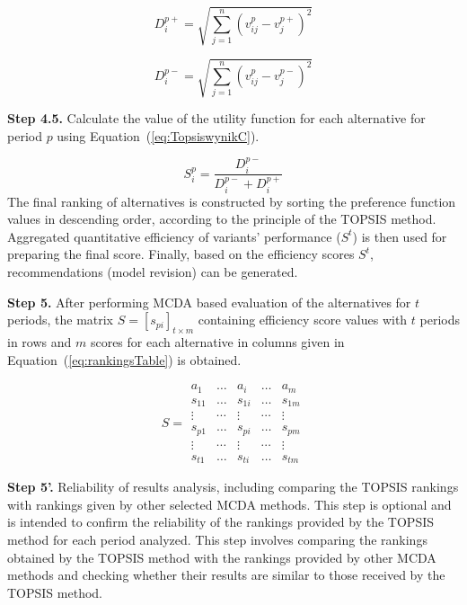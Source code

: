 \documentclass[5p,times]{elsarticle}
\begin{document}
\begin{equation}
    D_{i}^{p+} = \sqrt{\sum_{j=1}^{n}(v_{ij}^{p} - v_{j}^{p+})^{2}} \label{eq:sqrtPIS}
\end{equation}

\begin{equation}
    D_{i}^{p-} = \sqrt{\sum_{j=1}^{n}(v_{ij}^{p}-v_{j}^{p-})^{2}} \label{eq:sqrtNIS}
\end{equation}

\textbf{Step 4.5.} Calculate the value of the utility function for each alternative for period $p$ using Equation~(\ref{eq:TopsiswynikC}).

\begin{equation}
    S_{i}^{p} = \frac{D_{i}^{p-}}{D_{i}^{p-}+D_{i}^{p+}} \label{eq:TopsiswynikC}
\end{equation}
%
The final ranking of alternatives is constructed by sorting the preference function values in descending order, according to the principle of the TOPSIS method. Aggregated quantitative efficiency of variants' performance ($S^{t}$) is then used for preparing the final score. Finally, based on the efficiency scores $S^{t}$, recommendations (model revision) can be generated. 

\textbf{Step 5.}
After performing MCDA based evaluation of the alternatives for $t$ periods, the matrix $S = [s_{pi}]_{t \times m}$ containing efficiency score values with $t$ periods in rows and $m$ scores for each alternative in columns given in Equation~(\ref{eq:rankingsTable}) is obtained.

\begin{equation}
    S = \begin{array}{lllll}
    a_{1} & \ldots & a_{i} & \ldots & a_{m} \\ \hline
    s_{11} & \ldots & s_{1i} & \ldots & s_{1m} \\
    \vdots & \cdots & \vdots & \cdots & \vdots \\
    s_{p1} & \ldots & s_{pi} & \ldots & s_{pm} \\
    \vdots & \cdots & \vdots & \cdots & \vdots \\
    s_{t1} & \ldots & s_{ti} & \ldots & s_{tm} \label{eq:rankingsTable}
\end{array}
\end{equation}

\textbf{Step 5'.} Reliability of results analysis, including comparing the TOPSIS rankings with rankings given by other selected MCDA methods. This step is optional and is intended to confirm the reliability of the rankings provided by the TOPSIS method for each period analyzed. This step involves comparing the rankings obtained by the TOPSIS method with the rankings provided by other MCDA methods and checking whether their results are similar to those received by the TOPSIS method.
\end{document}
